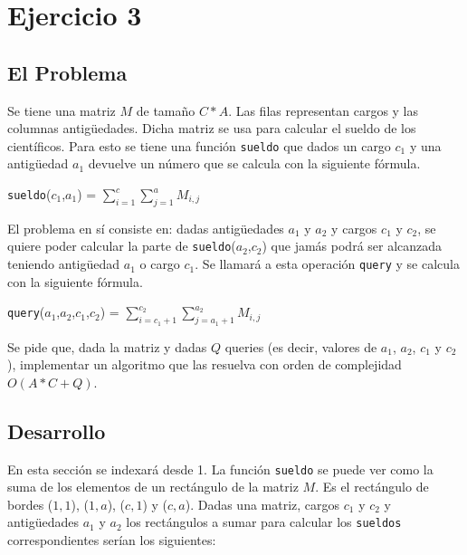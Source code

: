 \section{Ejercicio 3}
\subsection{El Problema}
Se tiene una matriz $M$ de tamaño $C*A$. Las filas representan cargos y las columnas antig\"uedades. Dicha matriz se usa para calcular el sueldo de los cient\'ificos. Para esto se tiene una función \texttt{sueldo} que dados un cargo $c_1$ y una antigüedad $a_1$ devuelve un número que se calcula con la siguiente fórmula.

\texttt{sueldo}($c_1$,$a_1$) = $\sum_{i=1}^{c} \sum_{j=1}^{a} M_{i,j}$

El problema en sí consiste en: dadas antigüedades $a_1$ y $a_2$ y cargos $c_1$ y $c_2$, se quiere poder calcular la parte de \texttt{sueldo}($a_2$,$c_2$) que jamás podrá ser alcanzada teniendo antigüedad $a_1$ o cargo $c_1$. Se llamará a esta operación \texttt{query} y se calcula con la siguiente fórmula.

\texttt{query}($a_1$,$a_2$,$c_1$,$c_2$) = $\sum_{i=c_1+1}^{c_2} \sum_{j=a_1+1}^{a_2} M_{i,j}$

Se pide que, dada la matriz y dadas $Q$ queries (es decir, valores de $a_1$, $a_2$, $c_1$ y $c_2$), implementar un algoritmo que las resuelva con orden de complejidad $O(A*C + Q)$.

\subsection{Desarrollo}

En esta sección se indexará desde 1. La función \texttt{sueldo} se puede ver como la suma de los elementos de un rectángulo de la matriz $M$. Es el rectángulo de bordes ($1,1$), ($1,a$), ($c,1$) y ($c,a$). Dadas una matriz, cargos $c_1$ y $c_2$ y antigüedades $a_1$ y $a_2$ los rectángulos a sumar para calcular los \texttt{sueldos} correspondientes serían los siguientes:

